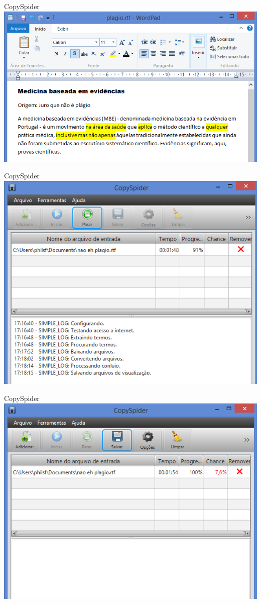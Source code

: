 \documentclass{beamer}
\begin{document}
\begin{frame}{CopySpider}
  \includegraphics[width=\textwidth]{Referencias/plagio}
\end{frame}

\begin{frame}{CopySpider}
  \includegraphics[height=.95\textheight]{Referencias/copyspider1}
\end{frame}

\begin{frame}{CopySpider}
  \includegraphics[height=.95\textheight]{Referencias/copyspider2}
\end{frame}
\end{document}
